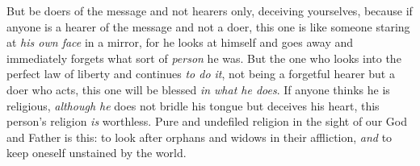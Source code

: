 \begin{biblechapter}
\verse But be doers of the message and not hearers only, deceiving yourselves,
\verse because if anyone is a hearer of the message and not a doer, this one is like someone staring at \textit{his own face} in a mirror,
\verse for he looks at himself and goes away and immediately forgets what sort of \textit{person} he was.
\verse But the one who looks into the perfect law of liberty and continues \textit{to do it}, not being a forgetful hearer but a doer who acts, this one will be blessed \textit{in what he does}.
\verse If anyone thinks he is religious, \textit{although he} does not bridle his tongue but deceives his heart, this person’s religion \textit{is} worthless.
\verse Pure and undefiled religion in the sight of our God and Father is this: to look after orphans and widows in their affliction, \textit{and} to keep oneself unstained by the world.
\end{biblechapter}

